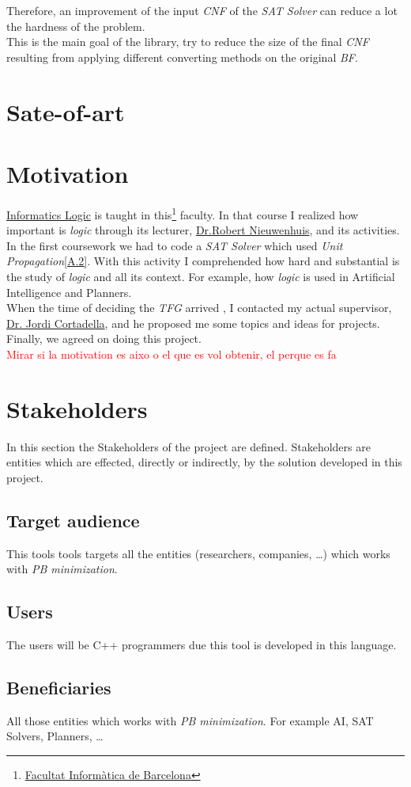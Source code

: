 Therefore, an improvement of the input \emph{CNF} of the \emph{SAT Solver} can reduce a lot the hardness of the problem. \\
This is the main goal of the library, try to reduce the size of the final \emph{CNF} resulting from applying different converting methods on the original \emph{BF}.

\section{Sate-of-art}


\section{Motivation}

\href{https://www.fib.upc.edu/en/studies/bachelors-degrees/bachelor-degree-informatics-engineering/curriculum/syllabus/LI}{Informatics Logic} is taught in this\footnote{\href{https://www.fib.upc.edu/en/}{Facultat Informàtica de Barcelona}} faculty. In that course I realized how important is \emph{logic} through its lecturer, \href{http://www.lsi.upc.es/~roberto/}{Dr.Robert Nieuwenhuis}, and its activities. \\

In the first coursework we had to code a \emph{SAT Solver} which used \emph{Unit Propagation}\ref{A.2}. With this activity I comprehended how hard and substantial is the study of \emph{logic} and all its context. For example, how \emph{logic} is used in Artificial Intelligence and Planners.\\

When the time of deciding the \emph{TFG} arrived	, I contacted my actual supervisor, \href{https://www.cs.upc.edu/~jordicf/}{Dr. Jordi Cortadella}, and he proposed me some topics and ideas for projects. Finally, we agreed on doing this project. \\

\textcolor{red}{Mirar si la motivation es aixo o el que es vol obtenir, el perque es fa}

\section{Stakeholders}

In this section the Stakeholders of the project are defined. Stakeholders are entities which are effected, directly or indirectly, by the solution developed in this project. 
\subsection{Target audience}
This tools tools targets all the entities (researchers, companies, \ldots) which works with \emph{PB minimization}.
\subsection{Users}
The users will be C++ programmers due this tool is developed in this language.
\subsection{Beneficiaries}
All those entities which works with \emph{PB minimization}. For example AI, SAT Solvers, Planners, \ldots



